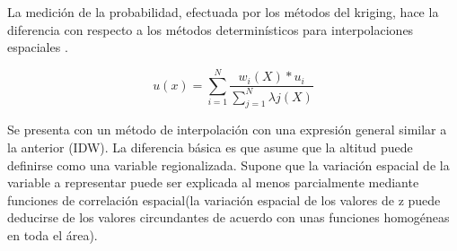 La medición de la probabilidad, efectuada por los métodos del kriging, hace la diferencia con
respecto a los métodos determinísticos para interpolaciones espaciales
\citep{villatoro2007comparacion}.

\begin{equation}\label{eq:interpolacion-kriging}
 u(x) = \sum_{i=1}^{N} \frac{w_i(X) * u_{i}}{\sum_{j=1}^{N} \lambda{j}(X)}
\end{equation}

Se presenta con un método de interpolación con una expresión general similar a la anterior (IDW).
La diferencia básica es que asume que la altitud puede definirse como una variable regionalizada.
Supone que la variación espacial de la variable a representar puede ser explicada al menos
parcialmente mediante funciones de correlación espacial(la variación espacial de los valores de z
puede deducirse de los valores circundantes de acuerdo con unas funciones homogéneas en toda el área).
